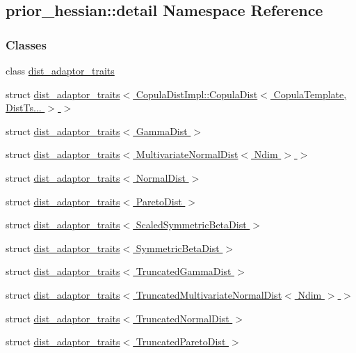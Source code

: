 \hypertarget{namespaceprior__hessian_1_1detail}{}\subsection{prior\+\_\+hessian\+:\+:detail Namespace Reference}
\label{namespaceprior__hessian_1_1detail}
\subsubsection*{Classes}
\begin{DoxyCompactItemize}
\item 
class \hyperlink{classprior__hessian_1_1detail_1_1dist__adaptor__traits}{dist\+\_\+adaptor\+\_\+traits}
\item 
struct \hyperlink{structprior__hessian_1_1detail_1_1dist__adaptor__traits_3_01CopulaDistImpl_1_1CopulaDist_3_01Cop7279db6753e87d864b5bda4f78bd9862}{dist\+\_\+adaptor\+\_\+traits$<$ Copula\+Dist\+Impl\+::\+Copula\+Dist$<$ Copula\+Template, Dist\+Ts... $>$ $>$}
\item 
struct \hyperlink{structprior__hessian_1_1detail_1_1dist__adaptor__traits_3_01GammaDist_01_4}{dist\+\_\+adaptor\+\_\+traits$<$ Gamma\+Dist $>$}
\item 
struct \hyperlink{structprior__hessian_1_1detail_1_1dist__adaptor__traits_3_01MultivariateNormalDist_3_01Ndim_01_4_01_4}{dist\+\_\+adaptor\+\_\+traits$<$ Multivariate\+Normal\+Dist$<$ Ndim $>$ $>$}
\item 
struct \hyperlink{structprior__hessian_1_1detail_1_1dist__adaptor__traits_3_01NormalDist_01_4}{dist\+\_\+adaptor\+\_\+traits$<$ Normal\+Dist $>$}
\item 
struct \hyperlink{structprior__hessian_1_1detail_1_1dist__adaptor__traits_3_01ParetoDist_01_4}{dist\+\_\+adaptor\+\_\+traits$<$ Pareto\+Dist $>$}
\item 
struct \hyperlink{structprior__hessian_1_1detail_1_1dist__adaptor__traits_3_01ScaledSymmetricBetaDist_01_4}{dist\+\_\+adaptor\+\_\+traits$<$ Scaled\+Symmetric\+Beta\+Dist $>$}
\item 
struct \hyperlink{structprior__hessian_1_1detail_1_1dist__adaptor__traits_3_01SymmetricBetaDist_01_4}{dist\+\_\+adaptor\+\_\+traits$<$ Symmetric\+Beta\+Dist $>$}
\item 
struct \hyperlink{structprior__hessian_1_1detail_1_1dist__adaptor__traits_3_01TruncatedGammaDist_01_4}{dist\+\_\+adaptor\+\_\+traits$<$ Truncated\+Gamma\+Dist $>$}
\item 
struct \hyperlink{structprior__hessian_1_1detail_1_1dist__adaptor__traits_3_01TruncatedMultivariateNormalDist_3_01Ndim_01_4_01_4}{dist\+\_\+adaptor\+\_\+traits$<$ Truncated\+Multivariate\+Normal\+Dist$<$ Ndim $>$ $>$}
\item 
struct \hyperlink{structprior__hessian_1_1detail_1_1dist__adaptor__traits_3_01TruncatedNormalDist_01_4}{dist\+\_\+adaptor\+\_\+traits$<$ Truncated\+Normal\+Dist $>$}
\item 
struct \hyperlink{structprior__hessian_1_1detail_1_1dist__adaptor__traits_3_01TruncatedParetoDist_01_4}{dist\+\_\+adaptor\+\_\+traits$<$ Truncated\+Pareto\+Dist $>$}
\end{DoxyCompactItemize}
